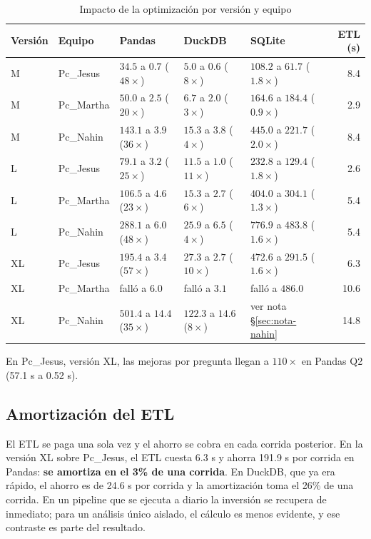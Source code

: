 \begin{table}[htbp]
\centering
\footnotesize
\caption{Impacto de la optimización por versión y equipo}
\label{tab:fase3-impacto}
\begin{tabularx}{\textwidth}{llXXXr}
\toprule
Versión & Equipo & Pandas & DuckDB & SQLite & ETL (s) \\
\midrule
M  & Pc\_Jesus  & $34.5$ a $0.7$ ($48\times$) & $5.0$ a $0.6$ ($8\times$) & $108.2$ a $61.7$ ($1.8\times$) & 8.4 \\
M  & Pc\_Martha & $50.0$ a $2.5$ ($20\times$) & $6.7$ a $2.0$ ($3\times$) & $164.6$ a $184.4$ ($0.9\times$) & 2.9 \\
M  & Pc\_Nahin  & $143.1$ a $3.9$ ($36\times$) & $15.3$ a $3.8$ ($4\times$) & $445.0$ a $221.7$ ($2.0\times$) & 8.4 \\
L  & Pc\_Jesus  & $79.1$ a $3.2$ ($25\times$) & $11.5$ a $1.0$ ($11\times$) & $232.8$ a $129.4$ ($1.8\times$) & 2.6 \\
L  & Pc\_Martha & $106.5$ a $4.6$ ($23\times$) & $15.3$ a $2.7$ ($6\times$) & $404.0$ a $304.1$ ($1.3\times$) & 5.4 \\
L  & Pc\_Nahin  & $288.1$ a $6.0$ ($48\times$) & $25.9$ a $6.5$ ($4\times$) & $776.9$ a $483.8$ ($1.6\times$) & 5.4 \\
XL & Pc\_Jesus  & $195.4$ a $3.4$ ($57\times$) & $27.3$ a $2.7$ ($10\times$) & $472.6$ a $291.5$ ($1.6\times$) & 6.3 \\
XL & Pc\_Martha & falló a $6.0$ & falló a $3.1$ & falló a $486.0$ & 10.6 \\
XL & Pc\_Nahin  & $501.4$ a $14.4$ ($35\times$) & $122.3$ a $14.6$ ($8\times$) & ver nota \S\ref{sec:nota-nahin} & 14.8 \\
\bottomrule
\end{tabularx}
\end{table}

En Pc\_Jesus, versión XL, las mejoras por pregunta llegan a $110\times$ en Pandas Q2 (57.1 s a 0.52 s).

\subsection{Amortización del ETL}

El ETL se paga una sola vez y el ahorro se cobra en cada corrida posterior. En la versión XL sobre Pc\_Jesus, el ETL cuesta 6.3 s y ahorra 191.9 s por corrida en Pandas: \textbf{se amortiza en el 3\% de una corrida}. En DuckDB, que ya era rápido, el ahorro es de 24.6 s por corrida y la amortización toma el 26\% de una corrida. En un pipeline que se ejecuta a diario la inversión se recupera de inmediato; para un análisis único aislado, el cálculo es menos evidente, y ese contraste es parte del resultado.

